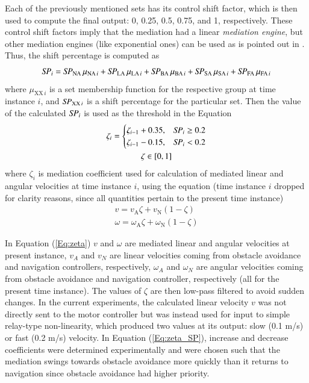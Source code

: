 Each of the previously mentioned sets has its control shift factor, which is then used to compute the final output: 0, 0.25, 0.5, 0.75, and 1, respectively. These control shift factors imply that the mediation had a linear \textit{mediation engine}, but other mediation engines (like exponential ones) can be used as is pointed out in \cite{Vincenti2009}. Thus, the shift percentage is computed as
\[
    \mathit{SP}_i = \mathit{SP}_{\textrm{NA}} \, \mu_{{\textrm{NA}}\,i} + \mathit{SP}_{\textrm{LA}} \, \mu_{{\textrm{LA}}\,i} + \mathit{SP}_{\textrm{BA}} \, \mu_{{\textrm{BA}}\,i} + \mathit{SP}_{\textrm{SA}} \, \mu_{{\textrm{SA}}\,i} + \mathit{SP}_{\textrm{FA}} \, \mu_{{\textrm{FA}}\,i}
\]
where $\mu_{\textrm{XX}\,i}$ is a set membership function for the respective group at time instance $i$, and $\mathit{SP}_{\textrm{XX}\,i}$ is a shift percentage for the particular set. Then the value of the calculated $\mathit{SP}_i$ is used as the threshold in the Equation
\begin{equation}
    \label{Eq:zeta_SP}
    \begin{gathered}
        \zeta_{i} =
        \begin{cases}
        \zeta_{i-1}+0.35, & \mathit{SP}_i\geq 0.2 \\
        \zeta_{i-1}-0.15, & \mathit{SP}_i < 0.2
        \end{cases}\\
        \zeta\in [0,1]
    \end{gathered}
\end{equation}
where $\zeta_i$ is mediation coefficient used for calculation of mediated linear and angular velocities at time instance $i$, using the equation (time instance $i$ dropped for clarity reasons, since all quantities pertain to the present time instance)
\begin{equation}
    \begin{split}
     v = v_\textrm{A}\zeta + v_\textrm{N}(1-\zeta)\\
    \omega = \omega_\textrm{A}\zeta + \omega_\textrm{N}(1-\zeta)
    \end{split}
    \label{Eq:zeta}
\end{equation}

In Equation (\ref{Eq:zeta}) $v$ and $\omega$ are mediated linear and angular velocities at present instance, $v_A$ and $v_N$ are linear velocities coming from obstacle avoidance and navigation controllers, respectively, $\omega_A$ and $\omega_N$ are angular velocities coming from obstacle avoidance and navigation controller, respectively (all for the present time instance). The values of $\zeta$ are then low-pass filtered to avoid sudden changes. In the current experiments, the calculated linear velocity $v$ was not directly sent to the motor controller but was instead used for input to simple relay-type non-linearity, which produced two values at its output: slow (0.1 m/s) or fast (0.2 m/s) velocity. In Equation (\ref{Eq:zeta_SP}), increase and decrease coefficients were determined experimentally and were chosen such that the mediation swings towards obstacle avoidance more quickly than it returns to navigation since obstacle avoidance had higher priority. 

